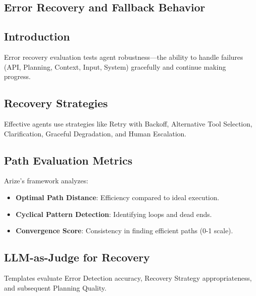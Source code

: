 \begin{TNtwocol}
\section{Error Recovery and Fallback Behavior }
\subsection{Introduction}
Error recovery evaluation tests agent robustness---the ability to handle failures (API, Planning, Context, Input, System) gracefully and continue making progress.

\subsection{Recovery Strategies}
Effective agents use strategies like Retry with Backoff, Alternative Tool Selection, Clarification, Graceful Degradation, and Human Escalation.

\subsection{Path Evaluation Metrics}
Arize's framework analyzes:
\begin{itemize}
    \item \textbf{Optimal Path Distance}: Efficiency compared to ideal execution.
    \item \textbf{Cyclical Pattern Detection}: Identifying loops and dead ends.
    \item \textbf{Convergence Score}: Consistency in finding efficient paths (0-1 scale).
\end{itemize}

\subsection{LLM-as-Judge for Recovery}
Templates evaluate Error Detection accuracy, Recovery Strategy appropriateness, and subsequent Planning Quality.
\end{TNtwocol}
